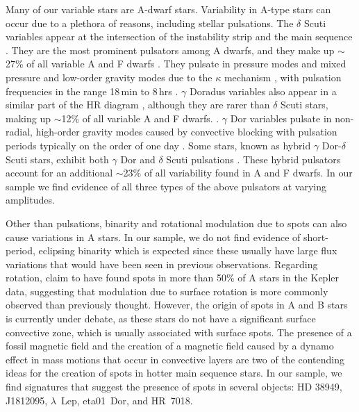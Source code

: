 \documentclass[twocolumn]{aastex631}
\begin{document}
Many of our variable stars are A-dwarf stars.  Variability in A-type stars can occur due to a plethora of reasons, including stellar pulsations.  The $\delta$ Scuti variables appear at the intersection of the instability strip and the main sequence \citep[e.g.,][]{Petit1987}.  They are the most prominent pulsators among A dwarfs, and they make up $\sim$27\% of all variable A and F dwarfs \citep{Uytterhoeven2011}.   They pulsate in pressure modes and mixed pressure and low-order gravity modes due to the $\kappa$ mechanism \citep{Lee1985}, with pulsation frequencies in the range 18\,min to 8\,hrs \citep{Amado2004}. $\gamma$ Doradus variables also appear in a similar part of the HR diagram \citep[e.g.,][]{Kaye1999}, although they are rarer than $\delta$ Scuti stars, making up $\sim$12\% of all variable A and F dwarfs. \citep{Uytterhoeven2011}. $\gamma$ Dor variables pulsate in non-radial, high-order gravity modes caused by convective blocking \citep{Guzik2000} with pulsation periods typically on the order of one day \citep{Grigahcene2010}.  Some stars, known as hybrid $\gamma$ Dor-$\delta$ Scuti stars, exhibit both $\gamma$ Dor and $\delta$ Scuti pulsations \citep{Grigahcene2010}.  These hybrid pulsators account for an additional $\sim$23\% of all variability found in A and F dwarfs. In our sample we find evidence of all three types of the above pulsators at varying amplitudes.

Other than pulsations, binarity and rotational modulation due to spots can also cause variations in A stars. In our sample, we do not find evidence of short-period, eclipsing binarity which is expected since these usually have large flux variations that would have been seen in previous observations. Regarding rotation, \citet{Balona2013, Balona2017} claim to have found spots in more than 50\% of A stars in the Kepler data, suggesting that modulation due to surface rotation is more commonly observed than previously thought. However, the origin of spots in A and B stars is currently under debate, as these stars do not have a significant surface convective zone, which is usually associated with surface spots. The presence of a fossil magnetic field \citep{Parker1955} and the creation of a magnetic field caused by a dynamo effect in mass motions that occur in convective layers \citep{Charbonneau2014} are two of the contending ideas for the creation of spots in hotter main sequence stars. In our sample, we find signatures that suggest the presence of spots in several objects:  HD 38949, J1812095, $\lambda$~Lep, eta01~Dor, and HR~7018.
\end{document}
